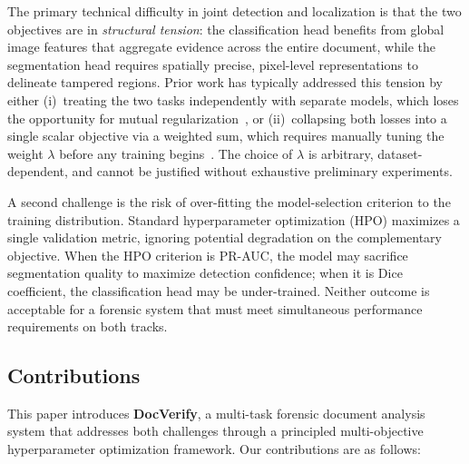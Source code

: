 The primary technical difficulty in joint detection and localization is that the
two objectives are in \emph{structural tension}: the classification head benefits
from global image features that aggregate evidence across the entire document,
while the segmentation head requires spatially precise, pixel-level representations
to delineate tampered regions. Prior work has typically addressed this tension by
either (i)~treating the two tasks independently with separate models, which loses
the opportunity for mutual regularization~\cite{trufor2023}, or (ii)~collapsing
both losses into a single scalar objective via a weighted sum, which requires
manually tuning the weight $\lambda$ before any training
begins~\cite{caruana1997multitask, kendall2018multi}. The choice of $\lambda$ is
arbitrary, dataset-dependent, and cannot be justified without exhaustive
preliminary experiments.

A second challenge is the risk of over-fitting the model-selection criterion to the
training distribution. Standard hyperparameter optimization (HPO) maximizes a
single validation metric, ignoring potential degradation on the complementary
objective. When the HPO criterion is PR-AUC, the model may sacrifice segmentation
quality to maximize detection confidence; when it is Dice coefficient, the
classification head may be under-trained. Neither outcome is acceptable for a
forensic system that must meet simultaneous performance requirements on both tracks.

\subsection*{Contributions}

This paper introduces \textbf{DocVerify}, a multi-task forensic document analysis
system that addresses both challenges through a principled multi-objective
hyperparameter optimization framework. Our contributions are as follows:

